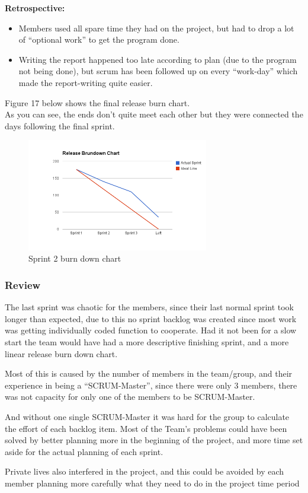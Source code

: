 \documentclass[11pt]{article}
\begin{document}
     \textbf{Retrospective:}
\begin{itemize}
\item Members used all spare time they had on the project, but had to drop
       a lot of ``optional work'' to get the program done.
\item Writing the report happened too late according to plan (due to the program
       not being done), but scrum has been followed up on every ``work-day''
       which made the report-writing quite easier.
\end{itemize}
Figure 17 below shows the final release burn chart. \\
As you can see, the ends don't quite meet each other but they were connected the days following the final sprint.
\begin{figure}[H]
  		\centering
    	\includegraphics[width=300px]{images/SCRUM/release burn.png}
    	\caption{Sprint 2 burn down chart}
\end{figure}

\subsubsection{Review}
\label{sec-5-1-5}

    The last sprint was chaotic for the members, since their last normal sprint 
    took longer than expected, due to this no sprint backlog was created since 
    most work was getting individually coded function to cooperate.
    Had it not been for a slow start the team would have had a more descriptive
    finishing sprint, and a more linear release burn down chart.
    
    Most of this is caused by the number of members in the team/group, and their 
    experience in being a ``SCRUM-Master'', since there were only 3 members, 
    there was not capacity for only one of the members to be SCRUM-Master.
    
    And without one single SCRUM-Master it was hard for the group to calculate
    the effort of each backlog item. Most of the Team's problems could have been
    solved by better planning more in the beginning of the project, and more time set 
    aside for the actual planning of each sprint.
    
    Private lives also interfered in the project, and this could be avoided by each
    member planning more carefully what they need to do in the project time period 
    
\end{document}
